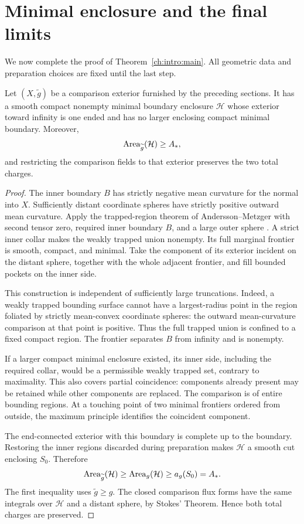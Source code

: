 \section{Minimal enclosure and the final limits}
\label{ch:final:section}

We now complete the proof of Theorem~\ref{ch:intro:main}. All geometric data and preparation choices are fixed until the last step.

\begin{lemma}\label{ch:final:minimal-enclosure}
Let $(X,\widetilde g)$ be a comparison exterior furnished by the preceding sections. It has a smooth compact nonempty minimal boundary enclosure $\mathcal H$ whose exterior toward infinity is one ended and has no larger enclosing compact minimal boundary. Moreover,
\[
 \operatorname{Area}_{\widetilde g}(\mathcal H)\ge A_*,
\]
and restricting the comparison fields to that exterior preserves the two total charges.
\end{lemma}

\begin{proof}
The inner boundary $B$ has strictly negative mean curvature for the normal into $X$. Sufficiently distant coordinate spheres have strictly positive outward mean curvature. Apply the trapped-region theorem of Andersson--Metzger with second tensor zero, required inner boundary $B$, and a large outer sphere \cite[Theorem~7.3]{AnderssonMetzger2009}. A strict inner collar makes the weakly trapped union nonempty. Its full marginal frontier is smooth, compact, and minimal. Take the component of its exterior incident on the distant sphere, together with the whole adjacent frontier, and fill bounded pockets on the inner side.

This construction is independent of sufficiently large truncations. Indeed, a weakly trapped bounding surface cannot have a largest-radius point in the region foliated by strictly mean-convex coordinate spheres: the outward mean-curvature comparison at that point is positive. Thus the full trapped union is confined to a fixed compact region. The frontier separates $B$ from infinity and is nonempty.

If a larger compact minimal enclosure existed, its inner side, including the required collar, would be a permissible weakly trapped set, contrary to maximality. This also covers partial coincidence: components already present may be retained while other components are replaced. The comparison is of entire bounding regions. At a touching point of two minimal frontiers ordered from outside, the maximum principle identifies the coincident component.

The end-connected exterior with this boundary is complete up to the boundary. Restoring the inner regions discarded during preparation makes $\mathcal H$ a smooth cut enclosing $S_0$. Therefore
\[
 \operatorname{Area}_{\widetilde g}(\mathcal H)
 \ge\operatorname{Area}_g(\mathcal H)\ge a_g(S_0)=A_*.
\]
The first inequality uses $\widetilde g\ge g$. The closed comparison flux forms have the same integrals over $\mathcal H$ and a distant sphere, by Stokes' Theorem. Hence both total charges are preserved.
\end{proof}

